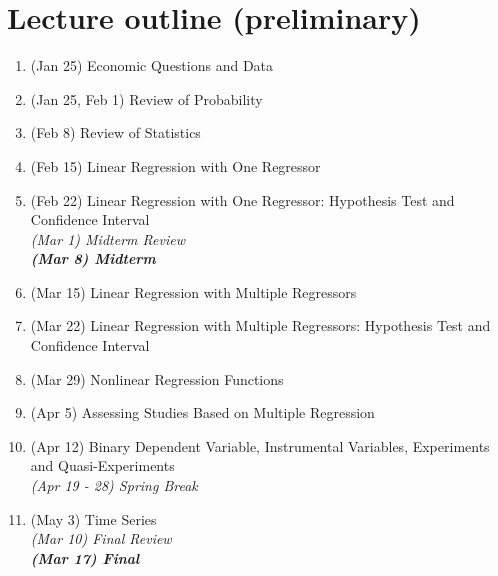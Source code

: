 \documentclass[12]{article}
\begin{document}
\newpage
\section*{Lecture outline (preliminary)}
\begin{enumerate}
    \item (Jan 25) Economic Questions and Data
    \item (Jan 25, Feb 1) Review of Probability
    \item (Feb 8) Review of Statistics
    \item (Feb 15) Linear Regression with One Regressor
    \item (Feb 22) Linear Regression with One Regressor: Hypothesis Test and Confidence Interval \\
    
    \newline
    \textit{(Mar 1) Midterm Review \\
    \textbf{(Mar 8) Midterm}} \\
    
    \item (Mar 15) Linear Regression with Multiple Regressors
    \item (Mar 22) Linear Regression with Multiple Regressors: Hypothesis Test and Confidence Interval
    \item (Mar 29) Nonlinear Regression Functions
    \item (Apr 5) Assessing Studies Based on Multiple Regression
    \item (Apr 12) Binary Dependent Variable, Instrumental Variables, Experiments and Quasi-Experiments \\
    
    \newline
    \textit{(Apr 19 - 28) Spring Break}\\
    
    \item (May 3) Time Series \\
    
    \newline
    \textit{(Mar 10) Final Review \\
    \textbf{(Mar 17) Final}} \\

\end{enumerate}
\end{document}
